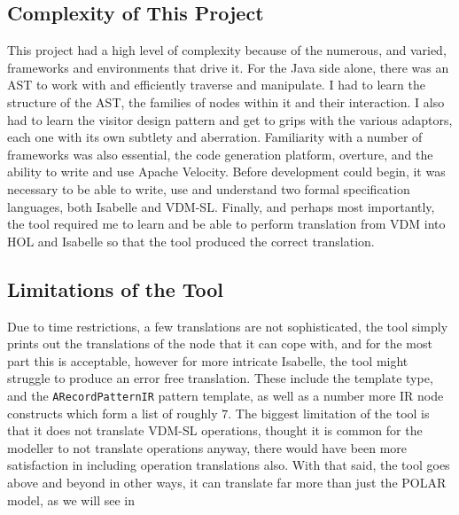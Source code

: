 \subsection{Complexity of This Project}
This project had a high level of complexity because of the numerous, and varied, frameworks and environments that drive it.
For the Java side alone, there was an AST to work with and efficiently traverse and manipulate. I had to learn the structure of the AST, the families of nodes within it and their interaction. I also had to learn the visitor design pattern and get to grips with the various adaptors, each one with its own subtlety and aberration. Familiarity with a number of frameworks was also essential, the code generation platform, overture, and the ability to write and use Apache Velocity. Before development could begin, it was necessary to be able to write, use and understand two formal specification languages, both Isabelle and VDM-SL. Finally, and perhaps most importantly, the tool required me to learn and be able to perform translation from VDM into HOL and Isabelle so that the tool produced the correct translation.

\subsection{Limitations of the Tool} \label{lott}
Due to time restrictions, a few translations are not sophisticated, the tool simply prints out the translations of the node that it can cope with, and for the most part this is acceptable, however for more intricate Isabelle, the tool might struggle to produce an error free translation. These include the template type, and the \lstinline[language=Isabelle]{ARecordPatternIR} pattern template, as well as a number more IR node constructs which form a list of roughly $7$. The biggest limitation of the tool is that it does not translate VDM-SL operations, thought it is common for the modeller to not translate operations anyway, there would have been more satisfaction in including operation translations also. With that said, the tool goes above and beyond in other ways, it can translate far more than just the POLAR model, as we will see in \label{atp} 

